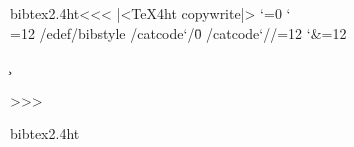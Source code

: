 \documentclass{article}
\begin{document}



\<bibtex2.4ht\><<<
|<TeX4ht copywrite|>
\catcode`\/=0
\catcode`\\=12
/edef/bibstyle{\bibstyle}
/catcode`/\=0
/catcode`//=12
\catcode`\&=12

\def\get{%
  \immediate\read15 to \line
  \ifeof15 \else
    \expandafter\scan\line @@@@@@@@@&&&&
    \expandafter\get
  \fi
}
\def\scan#1#2#3#4#5#6#7#8#9{\def\first{#1#2#3#4#5#6#7#8#9}\put}
\def\put#1&&&&{%
  \immediate\write15{\ifx \first\bibstyle 
    \ifx \style\empty \line \else \bibstyle{\style}\fi
    \else  \line\fi}}
\newcount\c
\def\Cats#1#2#3{\edef\temp{\the\c}%
  \c=#3
  \def\next{\catcode\c=#1
    \ifnum \c=#2 \let\next=\relax \fi
    \advance\c by  -1 \next}\next
  \c=\temp  }

\def\jaux#1#2{%
  \bgroup
    \def\style{#2}%
    \immediate\openin15=#1.aux
    \ifeof15 \else
      \Cats{12}{0}{255}%
      \Cats{11}{65}{90}%
      \Cats{11}{97}{122}%
      \catcode`\^^M=5
      \immediate\openout15=#1j.aux
      \get
      \immediate\write15{}
      \closeout15
    \fi
  \egroup
}


>>>



  \OutputCodE\<bibtex2.4ht\>
\end{document}
